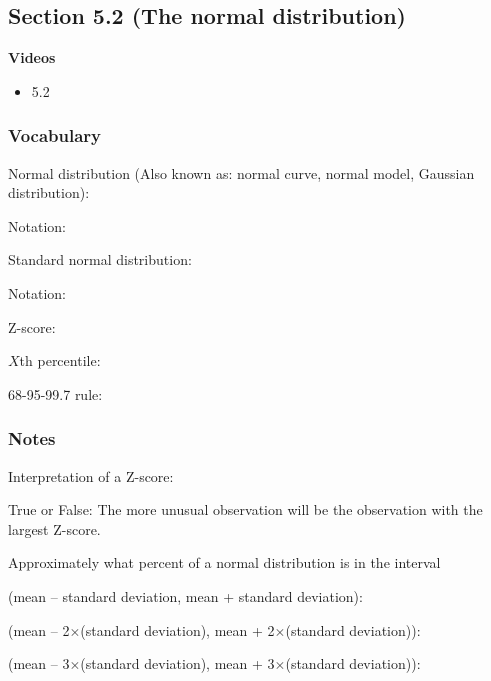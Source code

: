 \documentclass[
]{report}
\providecommand{\tightlist}{%
  \setlength{\itemsep}{0pt}\setlength{\parskip}{0pt}}
\newcommand{\rgs}{\vspace{12pt}} %
\newcommand{\rgi}{\hspace{24pt}}  %
\begin{document}
\hypertarget{section-5.2-the-normal-distribution}{%
\subsection*{Section 5.2 (The normal distribution)}\label{section-5.2-the-normal-distribution}}


\textbf{Videos}

\begin{itemize}
\tightlist
\item
  5.2
\end{itemize}


\hypertarget{vocabulary-11}{%
\subsubsection*{Vocabulary}\label{vocabulary-11}}

Normal distribution (Also known as: normal curve, normal model, Gaussian distribution):
\rgs

\rgi Notation:
\rgs

Standard normal distribution:
\rgs

\rgi Notation:
\rgs

Z-score:
\rgs

\(X\)th percentile:
\rgs

68-95-99.7 rule:
\rgs

\hypertarget{notes-16}{%
\subsubsection*{Notes}\label{notes-16}}

Interpretation of a Z-score:
\rgs

True or False: The more unusual observation will be the observation with the largest Z-score.

Approximately what percent of a normal distribution is in the interval

\rgi (mean -- standard deviation, mean + standard deviation):
\rgs

\rgi (mean -- 2\(\times\)(standard deviation), mean + 2\(\times\)(standard deviation)):
\rgs

\rgi (mean -- 3\(\times\)(standard deviation), mean + 3\(\times\)(standard deviation)):
\rgs
\end{document}
